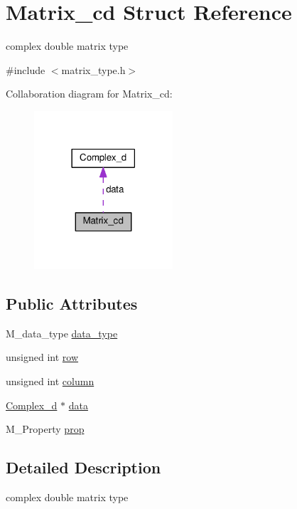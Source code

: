 \hypertarget{structMatrix__cd}{}\section{Matrix\+\_\+cd Struct Reference}
\label{structMatrix__cd}


complex double matrix type  




{\ttfamily \#include $<$matrix\+\_\+type.\+h$>$}



Collaboration diagram for Matrix\+\_\+cd\+:\nopagebreak
\begin{figure}[H]
\begin{center}
\leavevmode
\includegraphics[width=146pt]{structMatrix__cd__coll__graph}
\end{center}
\end{figure}
\subsection*{Public Attributes}
\begin{DoxyCompactItemize}
\item 
M\+\_\+data\+\_\+type \hyperlink{structMatrix__cd_a258625d86cd44986cb352e84b7d5509d}{data\+\_\+type}
\item 
unsigned int \hyperlink{structMatrix__cd_a327b0893124ef84c447dcb9d08d14403}{row}
\item 
unsigned int \hyperlink{structMatrix__cd_a4b92706967cff4acd04999c4fc2ba8d6}{column}
\item 
\hyperlink{structComplex__d}{Complex\+\_\+d} $\ast$ \hyperlink{structMatrix__cd_ad754acb46b524029b61d1894c65aeace}{data}
\item 
M\+\_\+\+Property \hyperlink{structMatrix__cd_a346b2397657fec70767d3bbdd210a129}{prop}
\end{DoxyCompactItemize}


\subsection{Detailed Description}
complex double matrix type 

